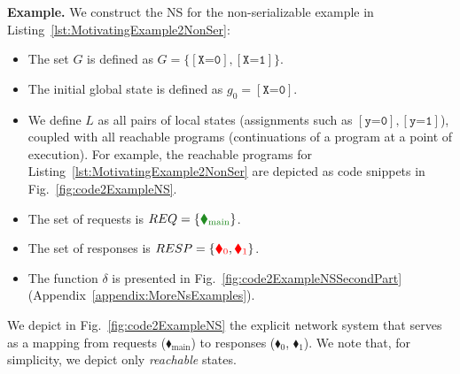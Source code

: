 %
\begin{tcolorbox}[colback=black!5!white, colframe=black, boxrule=1pt]
\textbf{Example.}
We construct the NS for the non-serializable example in Listing~\ref{lst:MotivatingExample2NonSer}:
%
\begin{itemize}
\item 
The set $G$ is defined as $G=\{[\texttt{X=0}], [\texttt{X=1}]\}$.

\item 
The initial global state is defined as $g_0 = [\texttt{X=0}]$.

\item 
We define $L$ as all pairs of local states (assignments such as $[\texttt{y=0}], [\texttt{y=1}]$), coupled with all reachable \toolname{} programs (continuations of a program at a point of execution).
For example, the reachable programs for Listing~\ref{lst:MotivatingExample2NonSer} are depicted as code snippets in Fig.~\ref{fig:code2ExampleNS}. 


\item 
The set of requests is $REQ = \{{\color{ForestGreen}\blacklozenge_\text{main}}\}$.

\item 
The set of responses is $RESP = \{{\color{red}\blacklozenge_0},{\color{red}\blacklozenge_1}\}$.

\item
The function \(\delta\) is presented in Fig.~\ref{fig:code2ExampleNSSecondPart} (Appendix~\ref{appendix:MoreNsExamples}).


\end{itemize}


We depict in Fig.~\ref{fig:code2ExampleNS} the explicit network system that
serves as a mapping from requests ({\color{ForestGreen}$\blacklozenge_\text{main}$}) to responses ({\color{red}$\blacklozenge_0$}, {\color{red}$\blacklozenge_1$}).
%
We note that, for simplicity, we depict only \textit{reachable} states.
%
\end{tcolorbox}

